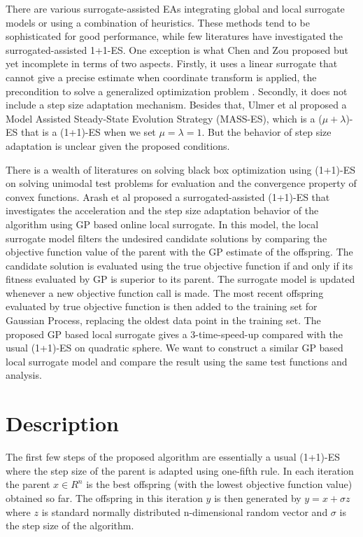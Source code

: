 There are various surrogate-assisted EAs integrating global and local surrogate models or using a combination of heuristics. These methods tend to be sophisticated for good performance, while few literatures have investigated the surrogated-assisted 1+1-ES. One exception is what Chen and Zou \cite{10.1007/978-3-319-09333-8_4} proposed but yet incomplete in terms of two aspects. Firstly, it uses a linear surrogate that cannot give a precise estimate when coordinate transform is applied, the precondition to solve a generalized optimization problem \cite{ARASH}. Secondly, it does not include a step size adaptation mechanism. Besides that, Ulmer et al \cite{Ulmer2005} proposed a Model Assisted Steady-State Evolution Strategy (MASS-ES), which is a ($\mu+\lambda$)-ES that is a (1+1)-ES when we set $\mu=\lambda=1$. But the behavior of step size adaptation is unclear given the proposed conditions.


There is a wealth of literatures on solving black box optimization using (1+1)-ES on solving unimodal test problems for evaluation and the convergence property of convex functions. Arash et al \cite{ARASH} proposed a surrogated-assisted (1+1)-ES that investigates the acceleration and the step size adaptation behavior of the algorithm using GP based online local surrogate. In this model, the local surrogate model filters the undesired candidate solutions by comparing the objective function value of the parent with the GP estimate of the offspring. The candidate solution is evaluated using the true objective function if and only if its fitness evaluated by GP is superior to its parent. The  surrogate model is updated whenever a new objective function call is made. The most recent offspring evaluated by true objective function is then added to the training set for Gaussian Process, replacing the oldest data point in the training set. The proposed GP based local surrogate gives a 3-time-speed-up compared with the usual (1+1)-ES on quadratic sphere. We want to construct a similar GP based local surrogate model and compare the result using the same test functions and analysis. 
 



\section{Description}

The first few steps of the proposed algorithm are essentially a usual (1+1)-ES where the step size of the parent is adapted using one-fifth rule. In each iteration the parent $x \in R^n$ is the best offspring (with the lowest objective function value) obtained so far. The offspring in this iteration $y$ is then generated by $y = x + \sigma z$ where $z$ is standard normally distributed n-dimensional random vector and $\sigma$ is the step size of the algorithm.


